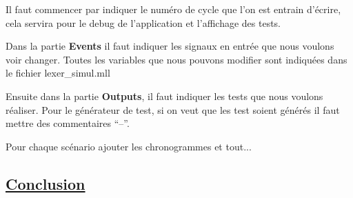 \medskip

Il faut commencer par indiquer le numéro de cycle que l'on est entrain
d'écrire, cela servira pour le debug de l'application et l'affichage
des tests.

\medskip

Dans la partie \textbf{Events} il faut indiquer les signaux en entrée que nous
voulons voir changer. Toutes les variables que nous pouvons modifier
sont indiquées dans le fichier lexer\_simul.mll 

\medskip

Ensuite dans la partie \textbf{Outputs}, il faut indiquer les tests
que nous voulons réaliser.
Pour le générateur de test, si on veut que les test soient générés il
faut mettre des commentaires ``--''.

\bigskip

Pour chaque scénario ajouter les chronogrammes et tout...

\subsection{\underline{Conclusion}}
\label{sec:Conclusion}


\newpage





